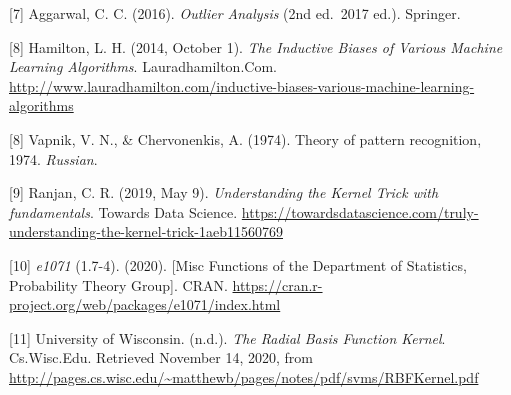 \documentclass[
]{article}
\begin{document}
{[}7{]} Aggarwal, C. C. (2016). \emph{Outlier Analysis} (2nd ed.~2017
ed.). Springer.

{[}8{]} Hamilton, L. H. (2014, October 1). \emph{The Inductive Biases of
Various Machine Learning Algorithms}. Lauradhamilton.Com.
\url{http://www.lauradhamilton.com/inductive-biases-various-machine-learning-algorithms}

{[}8{]} Vapnik, V. N., \& Chervonenkis, A. (1974). Theory of pattern
recognition, 1974. \emph{Russian}.

{[}9{]} Ranjan, C. R. (2019, May 9). \emph{Understanding the Kernel
Trick with fundamentals}. Towards Data Science.
\url{https://towardsdatascience.com/truly-understanding-the-kernel-trick-1aeb11560769}

{[}10{]} \emph{e1071} (1.7-4). (2020). {[}Misc Functions of the
Department of Statistics, Probability Theory Group{]}. CRAN.
\url{https://cran.r-project.org/web/packages/e1071/index.html}

{[}11{]} University of Wisconsin. (n.d.). \emph{The Radial Basis
Function Kernel}. Cs.Wisc.Edu. Retrieved November 14, 2020, from
\url{http://pages.cs.wisc.edu/~matthewb/pages/notes/pdf/svms/RBFKernel.pdf}
\end{document}
